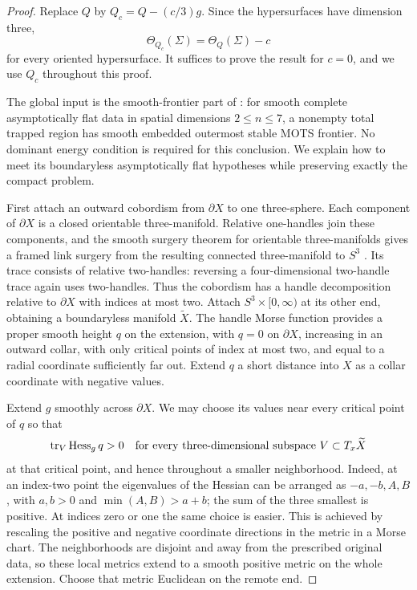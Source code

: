 \begin{proof}
Replace $Q$ by $Q_c=Q-(c/3)g$.  Since the hypersurfaces have dimension three,
\begin{equation}\label{four:geo:threshold-shift}
 \Theta_{Q_c}(\Sigma)=\Theta_Q(\Sigma)-c
\end{equation}
for every oriented hypersurface.  It suffices to prove the result for
$c=0$, and we use $Q_c$ throughout this proof.

The global input is the smooth-frontier part of
\cite[Theorem~4.6]{AnderssonEichmairMetzger2011}: for smooth complete asymptotically flat data in
spatial dimensions $2\le n\le7$, a nonempty total trapped region has smooth
embedded outermost stable MOTS frontier.  No dominant energy condition is
required for this conclusion.  We explain how to meet its boundaryless
asymptotically flat hypotheses while preserving exactly the compact problem.

First attach an outward cobordism from $\partial X$ to one three-sphere.
Each component of $\partial X$ is a closed orientable three-manifold.  Relative
one-handles join these components, and the smooth surgery theorem for
orientable three-manifolds gives a framed link surgery from the resulting
connected three-manifold to $S^3$ \cite[Theorem~6, p.~522]{Wallace1960}.  Its trace consists of
relative two-handles: reversing a four-dimensional two-handle trace again
uses two-handles.  Thus the cobordism has a handle decomposition relative to
$\partial X$ with indices at most two.  Attach $S^3\times[0,\infty)$ at its
other end, obtaining a boundaryless manifold $\widetilde X$.  The handle
Morse function provides a proper smooth height $q$
on the extension, with $q=0$ on $\partial X$, increasing in an outward
collar, with only critical points of index at most two, and equal to a radial
coordinate sufficiently far out.  Extend $q$ a short distance into $X$ as a
collar coordinate with negative values.

Extend $g$ smoothly across $\partial X$.  We may choose its values near every
critical point of $q$ so that
\begin{equation}\label{four:geo:morse-trace}
 \operatorname{tr}_V\operatorname{Hess}_g q>0
 \quad\text{for every three-dimensional subspace }V\subset T_x\widetilde X
\end{equation}
at that critical point, and hence throughout a smaller neighborhood.  Indeed,
at an index-two point the eigenvalues of the Hessian can be arranged as
$-a,-b,A,B$, with $a,b>0$ and $\min(A,B)>a+b$; the sum of the three smallest
is positive.  At indices zero or one the same choice is easier.  This is
achieved by rescaling the positive and negative coordinate directions in
the metric in a Morse chart.  The neighborhoods are disjoint and away from
the prescribed original data, so these local metrics extend to a smooth
positive metric on the whole extension.  Choose that metric Euclidean on
the remote end.


\end{proof}
